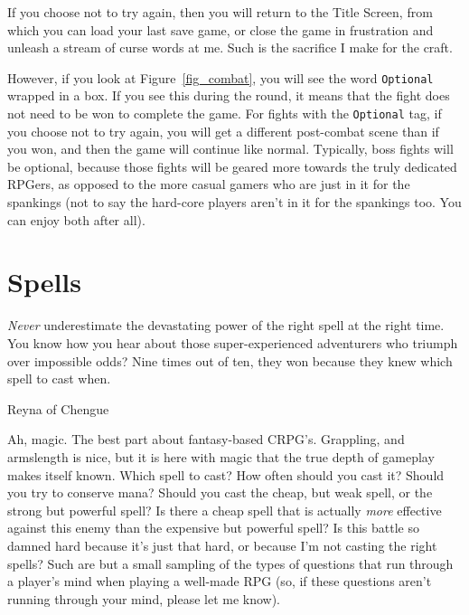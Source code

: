 \documentclass{report}
\begin{document}
\begin{itemize}
\begin{itemize}
If you choose not to try again, then you will return to the Title Screen, from
which you can load your last save game, or close the game in frustration and 
unleash a stream of curse words at me. Such is the sacrifice I make for the craft.

However, if you look at Figure~\ref{fig_combat}, you will see the word 
\verb|Optional| wrapped in a box. If you see this during the round, it means that
the fight does not need to be won to complete the game. For fights with the
\verb|Optional| tag, if you choose not to try again, you will get a different
post-combat scene than if you won, and then the game will continue like normal.
Typically, boss fights will
be optional, because those fights will be geared more towards the truly dedicated
RPGers, as opposed to the more casual
gamers who are just in it for the spankings (not to say the hard-core players 
aren't in it for the spankings too. You can enjoy both after all).

\chapter{Spells}
\label{ch_spells}
\epigraph{\emph{Never} underestimate the devastating power of the right spell at the right time. You know how you hear about those super-experienced adventurers who triumph
over impossible odds? Nine times out of ten, they won because they knew which spell to cast when.}{Reyna of Chengue}

Ah, magic. The best part about fantasy-based CRPG's. Grappling, and armslength is nice, but it is here with magic that the true depth of gameplay makes itself 
known. Which spell to cast? How often should you cast it? Should you try to conserve mana? Should you cast the cheap, but weak spell, or the strong but powerful spell?
Is there a cheap spell that is actually \emph{more} effective against this enemy than the expensive but powerful spell? Is this battle so damned hard because it's just
that hard, or because I'm not casting the right spells? Such are but a small sampling of the types of questions that run through a player's mind when playing a well-made
RPG (so, if these questions aren't running through your mind, please let me know). 


\end{itemize}
\end{itemize}
\end{document}
